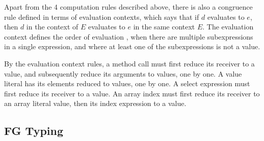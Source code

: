 Apart from the 4 computation rules described above, there is also a congruence
rule defined in terms of evaluation contexts, which says that if $d$ evaluates
to $e$, then $d$ in the context of $E$ evaluates to $e$ in the same context $E$.
The evaluation context defines the order of evaluation \autocite{evalContexts},
when there are multiple subexpressions in a single expression, and where at
least one of the subexpressions is not a value.

By the evaluation context rules, a method call must first reduce its receiver to
a value, and subsequently reduce its arguments to values, one by one. A value
literal has its elements reduced to values, one by one. A select expression must
first reduce its receiver to a value. An array index must first reduce its
receiver to an array literal value, then its index expression to a value.




\subsection{FG Typing}




